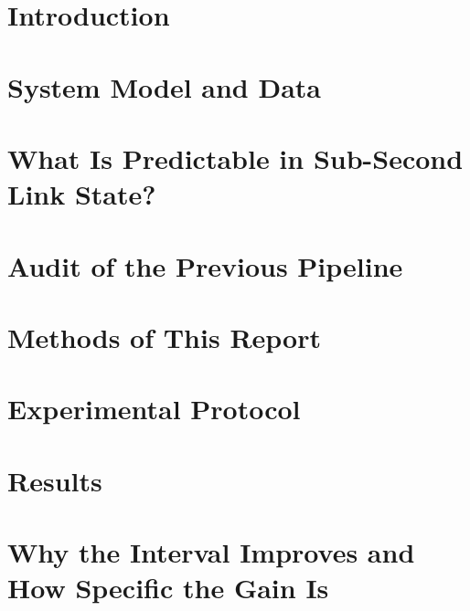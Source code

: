 \documentclass[11pt]{article}
\begin{document}
\section{Introduction}


\section{System Model and Data}


\section{What Is Predictable in Sub-Second Link State?}
\label{sec:predictable}


\section{Audit of the Previous Pipeline}
\label{sec:audit}



\section{Methods of This Report}
\label{sec:methods}


\section{Experimental Protocol}
\label{sec:protocol}


\section{Results}
\label{sec:results}


\section{Why the Interval Improves and How Specific the Gain Is}
\label{sec:why}

\end{document}
